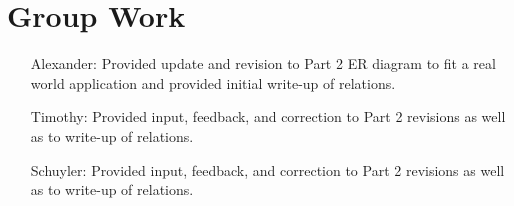 \documentclass[american,extrafontsizes,12pt,portrait,letterpaper,oneside,onecolumn,article,final]{memoir}
\begin{document}
\section*{Group Work}
%
\begin{samepage}%
\begin{enumerate}[leftmargin=*,widest={Alexander:}]

\item[Alexander:]
%
Provided update and revision to Part 2 ER diagram to fit a real world application and provided initial write\hyp up of relations.

\item[Timothy:]
%
Provided input, feedback, and correction to Part 2 revisions as well as to write\hyp up of relations.

\item[Schuyler:]
%
Provided input, feedback, and correction to Part 2 revisions as well as to write\hyp up of relations.

\end{enumerate}%
\end{samepage}
\end{document}
